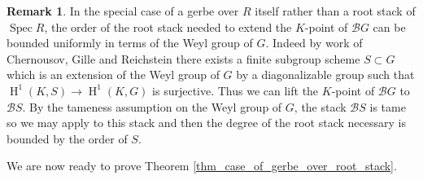 \documentclass{amsart}
\theoremstyle{definition}
\newtheorem{remark}[remark]{Remark}
\newcommand{\cB}{\mathcal{B}}
\newcommand{\oH}{\operatorname{H}}
\newcommand{\spec}{\operatorname{Spec}}
\begin{document}
\begin{remark}\label{rem:bounding} In the special case of a gerbe over $R$ itself rather than a root stack of $\spec R$, the order of the root stack needed to extend the $K$-point of $\cB G$ can be bounded uniformly in terms of the Weyl group of $G$. Indeed by work of Chernousov, Gille and Reichstein \cite{chernousov2006resolving, chernousov2008reduction} there exists a finite subgroup scheme $S \subset G$ which is an extension of the Weyl group of $G$ by a diagonalizable group such that $\oH^1(K,S) \to \oH^1(K,G)$ is surjective. Thus we can lift the $K$-point of $\cB G$ to $\cB S$. By the tameness assumption on the Weyl group of $G$, the stack $\cB S$ is tame so we may apply \cite{bresciani2024arithmetic} to this stack and then the degree of the root stack necessary is bounded by the order of $S$. 
    
\end{remark}

We are now ready to prove Theorem \ref{thm_case_of_gerbe_over_root_stack}.
\end{document}
